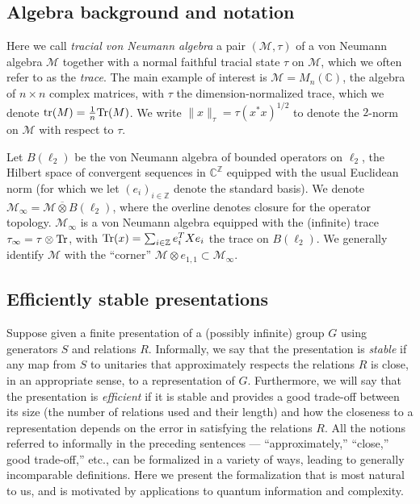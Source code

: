 \documentclass[11pt]{article}
\theoremstyle{definition}
\newcommand{\Tr}{\mbox{\rm Tr}}
\newcommand{\C}{\ensuremath{\mathbb{C}}}
\newcommand{\Z}{\ensuremath{\mathbb{Z}}}
\newcommand{\mM}{\ensuremath{\mathcal{M}}}
\DeclareMathOperator{\tr}{tr}
\begin{document}
\subsection{Algebra background and notation}

  Here we call \emph{tracial von Neumann algebra} a pair $(\mM,\tau)$ of a von Neumann algebra $\mM$ together with a normal faithful tracial state $\tau$ on $\mM$, which we often refer to as the \emph{trace}. The main example of interest is $\mM=M_n(\C)$, the algebra of $n\times n$ complex matrices, with $\tau$ the dimension-normalized trace, which we denote $\tr(M)=\frac{1}{n}\Tr(M)$. 	We write $\|x\|_\tau=\tau(x^*x)^{1/2}$ to denote the $2$-norm on $\mM$ with respect to $\tau$. 
	
	Let $B(\ell_2)$ be the von Neumann algebra of bounded operators on $\ell_2$, the Hilbert space of convergent sequences in $\C^\Z$ equipped with the usual Euclidean norm (for which we let $(e_i)_{i \in \Z}$ denote the standard basis). We denote $\mM_\infty = \mM \overline{\otimes} B(\ell_2)$, where the overline denotes closure for the operator topology. $\mM_\infty$ is a von Neumann algebra equipped with the (infinite) trace $\tau_\infty = \tau \otimes \Tr$, with $\Tr(x)=\sum_{i\in \Z} e_i^T X e_i$ the trace on $B(\ell_2)$. We generally identify $\mM$ with the ``corner'' $\mM\otimes e_{1,1}\subset \mM_\infty$. 

\subsection{Efficiently stable presentations}

Suppose given a finite presentation of a (possibly infinite) group $G$ using generators $S$ and relations $R$. Informally, we say that the presentation is \emph{stable} if any map from $S$ to unitaries that approximately respects the relations $R$ is close, in an appropriate sense, to a representation of $G$. Furthermore, we will say that the presentation is \emph{efficient} if it is stable and provides a good trade-off between its size (the number of relations used and their length) and how the closeness to a representation depends on the error in satisfying the relations $R$. All the notions referred to informally in the preceding sentences --- ``approximately,'' ``close,'' good trade-off,'' etc., can be formalized in a variety of ways, leading to generally incomparable definitions. Here we present the formalization that is most natural to us, and is motivated by applications to quantum information and complexity. 
\end{document}
